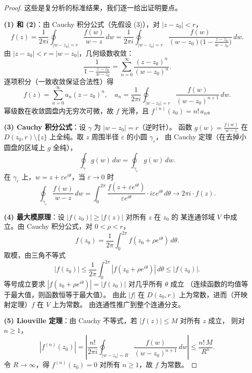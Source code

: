 \begin{proof}
这些是复分析的标准结果，我们逐一给出证明要点。

\textbf{(1) 和 (2)}：由 Cauchy 积分公式（先假设 (3)），对 $|z - z_0| < r$，
\[
  f(z) = \frac{1}{2\pi i} \oint_{|w-z_0|=r} \frac{f(w)}{w - z}\, dw
  = \frac{1}{2\pi i} \oint_{|w-z_0|=r}
    \frac{f(w)}{(w - z_0)\bigl(1 - \frac{z - z_0}{w - z_0}\bigr)}\, dw.
\]
由 $|z - z_0| < r = |w - z_0|$，几何级数收敛：
\[
  \frac{1}{1 - \frac{z-z_0}{w-z_0}}
  = \sum_{n=0}^{\infty} \frac{(z - z_0)^n}{(w - z_0)^n}.
\]
逐项积分（一致收敛保证合法性）得
\[
  f(z) = \sum_{n=0}^{\infty} a_n (z - z_0)^n,
  \quad a_n = \frac{1}{2\pi i} \oint_{|w-z_0|=r}
  \frac{f(w)}{(w - z_0)^{n+1}}\, dw.
\]
幂级数在收敛圆盘内无穷次可微，故 $f$ 光滑，且 $f^{(n)}(z_0) = n!\, a_n$。

\textbf{(3) Cauchy 积分公式}：设 $\gamma$ 为 $|w - z_0| = r$（逆时针）。
函数 $g(w) = \frac{f(w)}{w - z}$ 在 $\overline{D(z_0, r)} \setminus \{z\}$
上全纯。取 $z$ 周围半径 $\varepsilon$ 的小圆 $\gamma_\varepsilon$，
由 Cauchy 定理（在去掉小圆盘的区域上 $g$ 全纯），
\[
  \oint_\gamma g(w)\, dw = \oint_{\gamma_\varepsilon} g(w)\, dw.
\]
在 $\gamma_\varepsilon$ 上，$w = z + \varepsilon e^{i\theta}$，当 $\varepsilon \to 0$ 时
\[
  \oint_{\gamma_\varepsilon} \frac{f(w)}{w - z}\, dw
  = \int_0^{2\pi} \frac{f(z + \varepsilon e^{i\theta})}{\varepsilon e^{i\theta}}
    \cdot i\varepsilon e^{i\theta}\, d\theta
  \to 2\pi i \cdot f(z).
\]

\textbf{(4) 最大模原理}：设 $|f(z_0)| \geq |f(z)|$ 对所有 $z$ 在 $z_0$ 的
某连通邻域 $V$ 中成立。由 Cauchy 积分公式，对 $0 < \rho < r$，
\[
  f(z_0) = \frac{1}{2\pi} \int_0^{2\pi} f(z_0 + \rho e^{i\theta})\, d\theta.
\]
取模，由三角不等式
\[
  |f(z_0)| \leq \frac{1}{2\pi} \int_0^{2\pi}
  |f(z_0 + \rho e^{i\theta})|\, d\theta \leq |f(z_0)|.
\]
等号成立要求 $|f(z_0 + \rho e^{i\theta})| = |f(z_0)|$ 对几乎所有 $\theta$ 成立
（连续函数的均值等于最大值，则函数恒等于最大值）。
由此 $|f|$ 在 $D(z_0, r)$ 上为常数，进而（开映射定理）$f$ 在 $V$ 上为常数。
由连通性推广到整个连通分支。

\textbf{(5) Liouville 定理}：由 Cauchy 不等式，若 $|f(z)| \leq M$ 对所有 $z$ 成立，
则对 $n \geq 1$，
\[
  |f^{(n)}(z_0)| = \left|\frac{n!}{2\pi i}
  \oint_{|w-z_0|=R} \frac{f(w)}{(w-z_0)^{n+1}}\, dw\right|
  \leq \frac{n!\, M}{R^n}.
\]
令 $R \to \infty$，得 $f^{(n)}(z_0) = 0$ 对所有 $n \geq 1$，故 $f$ 为常数。
\end{proof}


